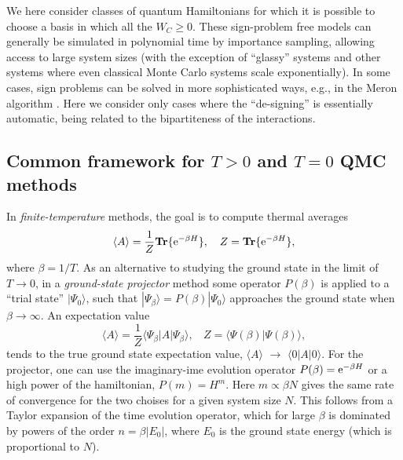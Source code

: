 \documentclass[range]{ar2e}
\begin{document}
We here consider classes of quantum Hamiltonians for which it is possible to choose a basis in which all 
the $W_C\geq 0$. These sign-problem free models can generally be simulated in polynomial time by 
importance sampling, allowing access to large system sizes (with the exception of ``glassy'' systems and
other systems where even classical Monte Carlo systems scale exponentially). In some cases, sign problems
can be solved in more sophisticated ways, e.g., in the Meron algorithm \cite{Chandrasekharan99}. Here we 
consider only cases where the ``de-signing'' is essentially automatic, being related to the bipartiteness 
of the interactions.
 
\subsection{Common framework for $T>0$ and $T=0$ QMC methods}
\label{ss:method}

In {\it finite-temperature} methods, the goal is to compute thermal averages
\begin{equation}
\langle A\rangle = \frac{1}{Z}{\bf Tr}\{ {\rm e}^{-\beta H}\},~~~
Z = {\bf Tr}\{ {\rm e}^{-\beta H}\},
\label{za1}
\end{equation}
where $\beta=1/T$. As an alternative to studying the ground state in the limit of  $T\to 0$, in a {\it ground-state projector} method some 
operator $P(\beta)$  is applied to a ``trial state'' $|\Psi_0\rangle$, such that $|\Psi_\beta \rangle = P(\beta)|\Psi_0\rangle$ approaches the 
ground state when $\beta \to \infty$. An expectation value
\begin{equation}
\langle A\rangle = \frac{1}{Z}\langle \Psi_\beta|A|\Psi_\beta\rangle,~~~~ Z = \langle \Psi(\beta)|\Psi(\beta)\rangle,
\label{za2}
\end{equation}
tends to the true ground state expectation value, $\langle A\rangle$ $\to$ $\langle 0| A|0\rangle$. For the projector, one can use the imaginary-ime
evolution operator $P(\beta)={\rm e}^{-\beta H}$ or a high power of the hamiltonian, $P(m)=H^m$. Here $m \propto \beta N$ gives the same rate of 
convergence for the two choises for a given system size $N$. This follows from a Taylor expansion of the time evolution operator, which for large 
$\beta$ is dominated by powers of the order $n=\beta |E_0|$, where $E_0$ is the ground state energy (which is proportional to $N$).
\end{document}
